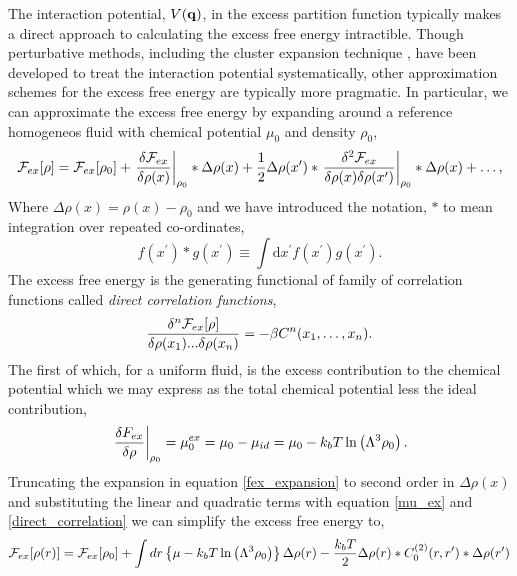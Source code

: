 The interaction potential, $V(\mathbf{q})$, in the excess partition function typically
makes a direct approach to calculating the excess free energy intractible.
Though perturbative methods, including the cluster expansion technique
\cite{MAYER41}, have been developed to treat the interaction potential
systematically, other approximation schemes for the excess free energy are
typically more pragmatic.  In particular, we can approximate the excess free
energy by expanding around a reference homogeneos fluid with chemical potential
$\mu_0$ and density $\rho_0$,
%
\begin{equation}
    \label{fex_expansion}
    \mathcal{F}_{ex}[\rho] = \mathcal{F}_{ex}[\rho_0]
        + \left . \frac{\delta \mathcal{F}_{ex}}{\delta\rho(x)} \right\vert_{\rho_0} \ast \Delta\rho(x) 
        + \frac{1}{2} \Delta\rho(x^\prime) \ast
            \left . \frac{\delta^2 \mathcal{F}_{ex}}{\delta\rho(x)\delta\rho(x^\prime)}
            \right\vert_{\rho_0} \ast \Delta\rho(x) 
        + \dots,
\end{equation}
%
Where $\Delta\rho(x) = \rho(x) - \rho_0$ and we have introduced the notation,
$\ast$ to mean integration over repeated co-ordinates,
%
\begin{equation}
    f(x^\prime) \ast g(x^\prime)
        \equiv \int\mathrm{d}x^\prime f(x^\prime) g(x^\prime).
\end{equation}
%
The excess free energy is the generating functional of family of correlation
functions called \textit{direct correlation functions}, 
%
\begin{equation}
    \label{direct_correlation}
    \frac{\delta^n \mathcal{F}_{ex}[\rho]}{\delta \rho(x_1) ... \delta \rho(x_n)}
        = -\beta C^{n}(x_1, \dots, x_n).
\end{equation}
%
The first of which, for a uniform fluid, is the excess contribution to the
chemical potential which we may express as the total chemical potential less
the ideal contribution, 
%
\begin{equation}
    \label{mu_ex}
    \left.\frac{\delta F_{ex}}{\delta \rho}\right\vert_{\rho_0}
        = \mu_0^{ex}
        = \mu_0 - \mu_{id} 
        = \mu_0 - k_bT\ln\left(\Lambda^3 \rho_0\right).
\end{equation}
%
Truncating the expansion in equation \ref{fex_expansion} to second order in
$\Delta\rho(x)$ and substituting the linear and quadratic terms with equation
\ref{mu_ex} and \ref{direct_correlation} we can simplify the excess free energy
to,
%
\begin{equation}
    \label{F_ex}
    \mathcal{F}_{ex}[\rho(r)] = \mathcal{F}_{ex}[\rho_0] 
        + \int dr 
            \left\lbrace\mu - k_bT \ln\left(\Lambda^3 \rho_0 \right)
            \right\rbrace \Delta\rho(r)
        - \frac{k_b T}{2} \Delta\rho(r) \ast C^{(2)}_0(r, r^\prime) 
            \ast \Delta\rho(r^\prime)
\end{equation}
